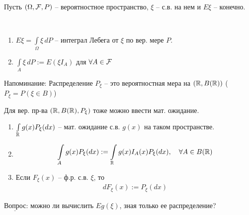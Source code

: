 Пусть $(\Omega, \mathcal{F}, P)$ -- вероятностное пространство, 
$\xi$ -- с.в. на нем и $E \xi$ -- конечно.

\begin{designations}~

  \begin{enumerate}
    \item 
      $E \xi = \int\limits_{\Omega} \xi\, d P$ -- интеграл Лебега от $\xi$ по вер. мере $P$.

    \item
      $\int\limits_{A} \xi\, d P := E (\xi I_A)$ для $\forall A \in \mathcal{F}$
  \end{enumerate}

\end{designations}

Напоминание: 
Распределение $P_{\xi}$ -- это вероятностная мера на $(\mathbb{R}, B(\mathbb{R}))$
($P_{\xi} = P(\xi \in B)$)

Для вер. пр-ва $(\mathbb{R}, B(\mathbb{R}), P_{\xi})$ тоже можно ввести мат. ожидание.

\begin{enumerate}
  \item
    $\int\limits_{\mathbb{R}} g(x) P_{\xi}(dx)$ -- мат. ожидание с.в. $g(x)$ на таком пространстве.

  \item
    \begin{align*}
      \int\limits_{A} g(x) P_{\xi}(dx) := \int\limits_{\mathbb{R}} g(x) I_{A}(x) P_{\xi}(dx),\quad 
      \forall A \in B(\mathbb{R})
    \end{align*}

  \item
    Если $F_{\xi}(x)$ -- ф.р. с.в. $\xi$, то
    \begin{align*}
      dF_{\xi}(x) := P_{\xi}(dx)
    \end{align*}
\end{enumerate}

$\underline{\text{Вопрос}}$: можно ли вычислить $E g(\xi)$, зная только ее распределение?

